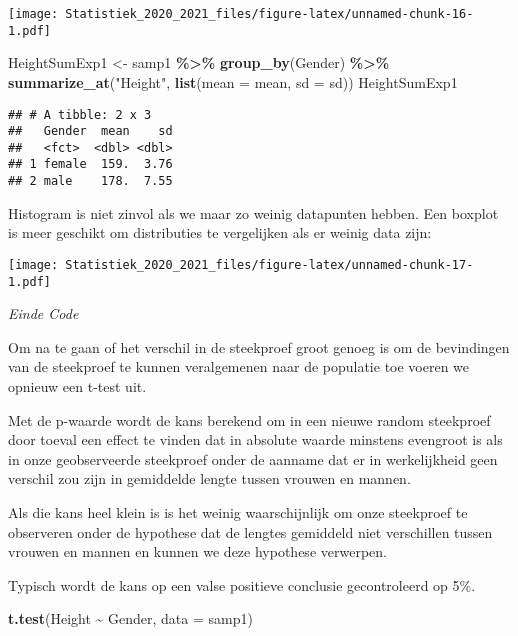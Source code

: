 \documentclass[
  12pt,dutch,coursenotes]{book}
\newenvironment{Shaded}{\begin{snugshade}}{\end{snugshade}}
\newcommand{\DataTypeTok}[1]{\textcolor[rgb]{0.13,0.29,0.53}{#1}}
\newcommand{\KeywordTok}[1]{\textcolor[rgb]{0.13,0.29,0.53}{\textbf{#1}}}
\newcommand{\NormalTok}[1]{#1}
\newcommand{\OperatorTok}[1]{\textcolor[rgb]{0.81,0.36,0.00}{\textbf{#1}}}
\newcommand{\StringTok}[1]{\textcolor[rgb]{0.31,0.60,0.02}{#1}}
\theoremstyle{definition}
\theoremstyle{definition}
\theoremstyle{definition}
\theoremstyle{remark}
\begin{document}
\texttt{[image: Statistiek\_2020\_2021\_files/figure-latex/unnamed-chunk-16-1.pdf]}

\begin{Shaded}
\begin{Highlighting}[]
\NormalTok{HeightSumExp1 \textless{}{-}}\StringTok{ }\NormalTok{samp1 }\OperatorTok{\%\textgreater{}\%}\StringTok{ }\KeywordTok{group\_by}\NormalTok{(Gender) }\OperatorTok{\%\textgreater{}\%}\StringTok{ }\KeywordTok{summarize\_at}\NormalTok{(}\StringTok{"Height"}\NormalTok{, }
    \KeywordTok{list}\NormalTok{(}\DataTypeTok{mean =}\NormalTok{ mean, }\DataTypeTok{sd =}\NormalTok{ sd))}
\NormalTok{HeightSumExp1}
\end{Highlighting}
\end{Shaded}

\begin{verbatim}
## # A tibble: 2 x 3
##   Gender  mean    sd
##   <fct>  <dbl> <dbl>
## 1 female  159.  3.76
## 2 male    178.  7.55
\end{verbatim}

Histogram is niet zinvol als we maar zo weinig datapunten hebben. Een boxplot is meer geschikt om distributies te vergelijken als er weinig data zijn:

\texttt{[image: Statistiek\_2020\_2021\_files/figure-latex/unnamed-chunk-17-1.pdf]}

\emph{Einde Code}

Om na te gaan of het verschil in de steekproef groot genoeg is om de bevindingen van de steekproef te kunnen veralgemenen naar de populatie toe voeren we opnieuw een t-test uit.

Met de p-waarde wordt de kans berekend om in een nieuwe random steekproef door toeval een effect te vinden dat in absolute waarde minstens evengroot is als in onze geobserveerde steekproef onder de aanname dat er in werkelijkheid geen verschil zou zijn in gemiddelde lengte tussen vrouwen en mannen.

Als die kans heel klein is is het weinig waarschijnlijk om onze steekproef te observeren onder de hypothese dat de lengtes gemiddeld niet verschillen tussen vrouwen en mannen en kunnen we deze hypothese verwerpen.

Typisch wordt de kans op een valse positieve conclusie gecontroleerd op 5\%.

\begin{Shaded}
\begin{Highlighting}[]
\KeywordTok{t.test}\NormalTok{(Height }\OperatorTok{\textasciitilde{}}\StringTok{ }\NormalTok{Gender, }\DataTypeTok{data =}\NormalTok{ samp1)}
\end{Highlighting}
\end{Shaded}
\end{document}
